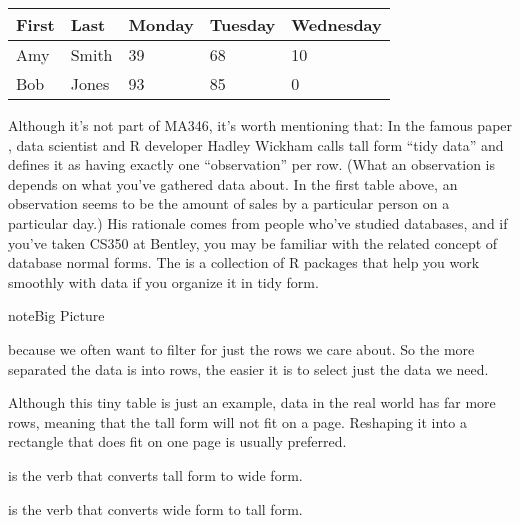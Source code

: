 \documentclass[letterpaper,10pt,english]{sphinxmanual}
\begin{document}


\begin{savenotes}\sphinxattablestart
\centering
\begin{tabulary}{\linewidth}[t]{|T|T|T|T|T|}
\hline
\sphinxstyletheadfamily 
First
&\sphinxstyletheadfamily 
Last
&\sphinxstyletheadfamily 
Monday
&\sphinxstyletheadfamily 
Tuesday
&\sphinxstyletheadfamily 
Wednesday
\\
\hline
Amy
&
Smith
&
39
&
68
&
10
\\
\hline
Bob
&
Jones
&
93
&
85
&
0
\\
\hline
\end{tabulary}
\par
\sphinxattableend\end{savenotes}

Although it’s not part of MA346, it’s worth mentioning that: In the famous paper , data scientist and R developer Hadley Wickham calls tall form “tidy data” and defines it as having exactly one “observation” per row.  (What an observation is depends on what you’ve gathered data about.  In the first table above, an observation seems to be the amount of sales by a particular person on a particular day.)  His rationale comes from people who’ve studied databases, and if you’ve taken CS350 at Bentley, you may be familiar with the related concept of database normal forms.  The  is a collection of R packages that help you work smoothly with data if you organize it in tidy form.

\begin{sphinxadmonition}{note}{Big Picture}

 because we often want to filter for just the rows we care about.  So the more separated the data is into rows, the easier it is to select just the data we need.

  Although this tiny table is just an example, data in the real world has far more rows, meaning that the tall form will not fit on a page.  Reshaping it into a rectangle that does fit on one page is usually preferred.

 is the verb that converts tall form to wide form.

 is the verb that converts wide form to tall form.
\end{sphinxadmonition}
\end{document}
